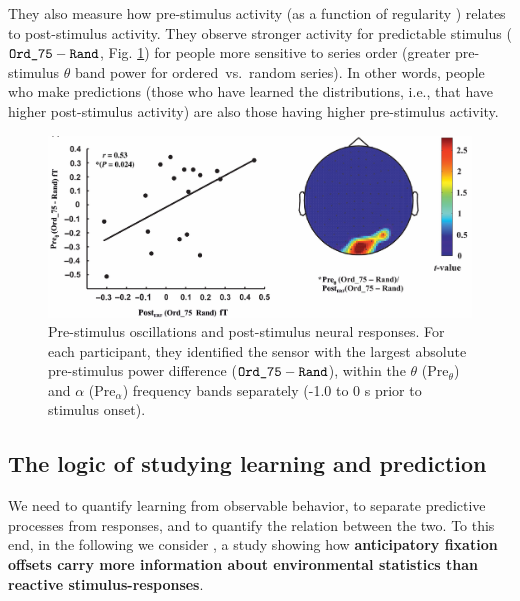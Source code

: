They also measure how pre-stimulus activity (as a function of regularity \notet) relates to post-stimulus activity. They observe  stronger activity for predictable stimulus ($\text{\texttt{Ord\_75}}-\text{\texttt{Rand}}$, Fig. \ref{fig:cashdollar_2}) for people more sensitive to series order (greater pre-stimulus $\theta$ band power for ordered~vs.~random series). In other words, people who make predictions (those who have learned the distributions, i.e., that have higher post-stimulus activity) are also those having higher pre-stimulus activity.


\begin{figure}[!ht]
    \centering
    \captionsetup{width=.8\linewidth}
    \includegraphics[width=0.7\linewidth]{images/cashdollar_2.png}
    \caption{Pre-stimulus oscillations and post-stimulus neural responses. For each participant, they identified the sensor with the largest absolute pre-stimulus power difference ($\text{\texttt{Ord\_75}}-\text{\texttt{Rand}}$), within the $\theta$ (Pre$_\theta$) and $\alpha$ (Pre$_\alpha$) frequency bands separately (-1.0 to 0 s prior to stimulus onset).}
    \label{fig:cashdollar_2}
\end{figure}

\subsection{The logic of studying learning and prediction}
We need to quantify learning from observable behavior, to separate predictive processes from responses, and to quantify the relation between the two. To this end, in the following we consider \cite{notaro}, a study showing how \textbf{anticipatory fixation offsets carry more information about environmental statistics than reactive stimulus-responses}.

